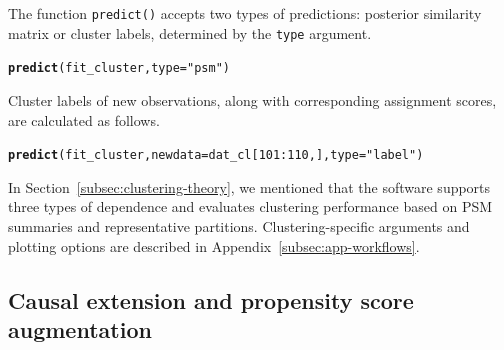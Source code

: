 \documentclass[article]{jss}\usepackage[]{graphicx}\usepackage[]{xcolor}
\makeatletter
\newcommand{\hlnum}[1]{\textcolor[rgb]{0.686,0.059,0.569}{#1}}%
\newcommand{\hlsng}[1]{\textcolor[rgb]{0.192,0.494,0.8}{#1}}%
\newcommand{\hlopt}[1]{\textcolor[rgb]{0,0,0}{#1}}%
\newcommand{\hldef}[1]{\textcolor[rgb]{0.345,0.345,0.345}{#1}}%
\newcommand{\hlkwc}[1]{\textcolor[rgb]{0.333,0.667,0.333}{#1}}%
\newcommand{\hlkwd}[1]{\textcolor[rgb]{0.737,0.353,0.396}{\textbf{#1}}}%
\newenvironment{kframe}{%
 \def\at@end@of@kframe{}%
 \ifinner\ifhmode%
  \def\at@end@of@kframe{\end{minipage}}%
  \begin{minipage}{\columnwidth}%
 \fi\fi%
 \def\FrameCommand##1{\hskip\@totalleftmargin \hskip-\fboxsep
 \colorbox{shadecolor}{##1}\hskip-\fboxsep
     \hskip-\linewidth \hskip-\@totalleftmargin \hskip\columnwidth}%
 \MakeFramed {\advance\hsize-\width
   \@totalleftmargin\z@ \linewidth\hsize
   \@setminipage}}%
 {\par\unskip\endMakeFramed%
 \at@end@of@kframe}
\newenvironment{knitrout}{}{} %
\DeclareRobustCommand{\code}[1]{\nolinkurl{#1}}
\makeatother
\begin{document}
The function \code{predict()} accepts two types of predictions: posterior similarity matrix or cluster labels, determined by the \code{type} argument.

\begin{knitrout}\footnotesize
{}\color{fgcolor}\begin{kframe}
\begin{alltt}
\hlkwd{predict}\hldef{(fit_cluster,} \hlkwc{type} \hldef{=} \hlsng{"psm"}\hldef{)}
\end{alltt}
\end{kframe}
\end{knitrout}

Cluster labels of new observations, along with corresponding assignment scores, are calculated as follows.

\begin{knitrout}\footnotesize
{}\color{fgcolor}\begin{kframe}
\begin{alltt}
\hlkwd{predict}\hldef{(fit_cluster,} \hlkwc{newdata} \hldef{= dat_cl[}\hlnum{101}\hlopt{:}\hlnum{110}\hldef{,],} \hlkwc{type} \hldef{=} \hlsng{"label"}\hldef{)}
\end{alltt}
\end{kframe}
\end{knitrout}

In Section~\ref{subsec:clustering-theory}, we mentioned that the software supports three types of dependence and evaluates clustering performance based on PSM summaries and representative partitions.
Clustering-specific arguments and plotting options are described in Appendix~\ref{subsec:app-workflows}.



\subsection{Causal extension and propensity score augmentation}
\label{subsec:overview-causal}
\end{document}
